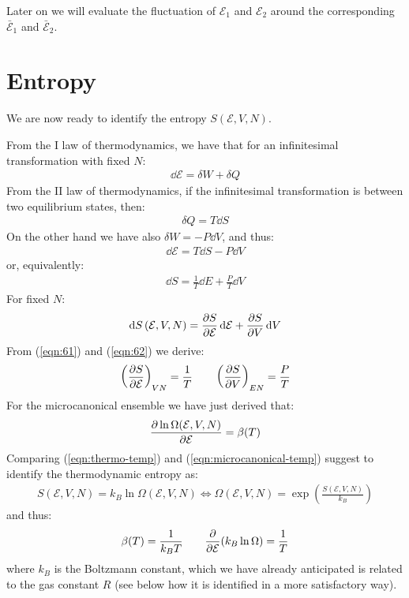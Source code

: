 \documentclass[../../main.tex]{subfiles}
\begin{document}
Later on we will evaluate the fluctuation of $\mathcal{E}_1$ and $\mathcal{E}_2$ around the corresponding $\bar{\mathcal{E}}_1$ and $\bar{\mathcal{E}}_2$.

\section{Entropy}

We are now ready to identify the entropy $S(\mathcal{E}, V, N)$.

\medskip

From the I law of thermodynamics, we have that for an infinitesimal transformation with fixed $N$:
\begin{align*}
    \dd{\mathcal{E}} = \delta W + \delta Q
\end{align*}
From the II law of thermodynamics, if the infinitesimal transformation is between two equilibrium states, then:
\begin{align*}
    \delta Q = T \dd{S}
\end{align*}
On the other hand we have also $\delta W = - P \dd{V}$, and thus:
\begin{align}\label{eqn:first-law}
    \dd{\mathcal{E}} = T \dd{S} - P \dd{V}
\end{align}
or, equivalently:
\begin{align}\label{eqn:61}
    \dd{S} = \frac{1}{T} \dd{E} + \frac{P}{T} \dd{V}  
\end{align}
For fixed $N$:
\begin{align}\label{eqn:62}
    \dd{S}(\mathcal{E}, V, N) = \pdv{S}{\mathcal{E}} \dd{\mathcal{E}} + \pdv{S}{V} \dd{V}
\end{align}
From (\ref{eqn:61}) and (\ref{eqn:62}) we derive:
\begin{align}\label{eqn:thermo-temp}
    \left(\pdv{S}{\mathcal{E}}\right)_{VN} = \frac{1}{T} \qquad \left(\pdv{S}{V}\right)_{EN} = \frac{P}{T} 
\end{align}
For the microcanonical ensemble we have just derived that:
\begin{align}\label{eqn:microcanonical-temp}
    \pdv{\ln \Omega (\mathcal{E}, V, N)}{\mathcal{E}} = \beta(T)
\end{align}
Comparing (\ref{eqn:thermo-temp}) and (\ref{eqn:microcanonical-temp}) suggest to identify the thermodynamic entropy as:
\begin{align}\label{eqn:entropy}
    S(\mathcal{E}, V, N) = k_B \ln \Omega(\mathcal{E}, V, N) \Leftrightarrow \Omega(\mathcal{E}, V, N) = \exp\left(\frac{S(\mathcal{E}, V, N)}{k_B} \right)
\end{align}
and thus:
\begin{align}\label{eqn:beta-t}
    \beta(T) = \frac{1}{k_B T} \qquad \pdv{\mathcal{E}}(k_B \ln \Omega) = \frac{1}{T}  
\end{align}
where $k_B$ is the Boltzmann constant, which we have already anticipated is related to the gas constant $R$ (see below how it is identified in a more satisfactory way).
\end{document}
